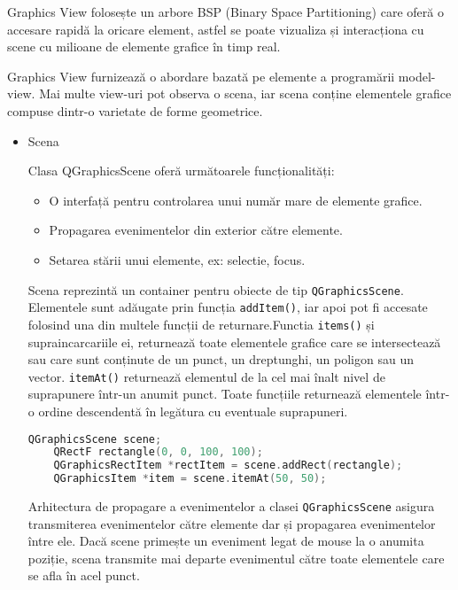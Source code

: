 Graphics View folosește un arbore BSP (Binary Space Partitioning) care oferă o accesare rapidă la oricare element, astfel se poate 
vizualiza și interacționa cu scene cu milioane de elemente grafice în timp real.\newline

Graphics View furnizează o abordare bazată pe elemente a programării model-view. Mai multe view-uri pot observa o scena, 
iar scena conține elementele grafice compuse dintr-o varietate de forme geometrice. \cite{qt}\newline

\begin{itemize}
    \item Scena
    
    Clasa QGraphicsScene oferă următoarele funcționalități:
    \begin{itemize}
        \item O interfață pentru controlarea unui număr mare de elemente grafice.
        \item Propagarea evenimentelor din exterior către elemente.
        \item Setarea stării unui elemente, ex: selectie, focus.
    \end{itemize}

    Scena reprezintă un container pentru obiecte de tip \verb|QGraphicsScene|. Elementele sunt adăugate prin funcția 
    \verb|addItem()|, iar apoi pot fi accesate folosind una din multele funcții de returnare.Functia 
    \verb|items()| și supraincarcariile ei, returnează toate elementele grafice care se intersectează sau 
    care sunt conținute de un punct, un dreptunghi, un poligon sau un vector. \verb|itemAt()| returnează elementul 
    de la cel mai înalt nivel de suprapunere într-un anumit punct. Toate funcțiile returnează elementele într-o ordine 
    descendentă în legătura cu eventuale suprapuneri.\cite{qt}\newline

    \begin{lstlisting}[language=C++]
    QGraphicsScene scene;
    QRectF rectangle(0, 0, 100, 100);
    QGraphicsRectItem *rectItem = scene.addRect(rectangle);
    QGraphicsItem *item = scene.itemAt(50, 50);
    \end{lstlisting}

    Arhitectura de propagare a evenimentelor a clasei \verb|QGraphicsScene| asigura transmiterea evenimentelor către 
    elemente dar și propagarea evenimentelor între ele. Dacă scene primește un eveniment legat de mouse la o anumita poziție, 
    scena transmite mai departe evenimentul către toate elementele care se afla în acel punct.\newline


\end{itemize}

